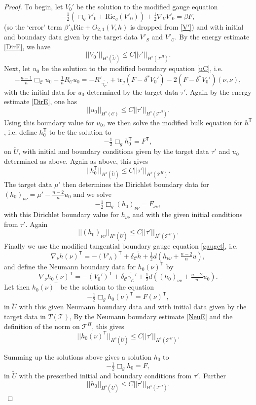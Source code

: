 \documentclass[10pt]{amsart}
\renewcommand{\b}{\beta}
\newcommand{\g}{\gamma}
\renewcommand{\d}{\delta}
\newcommand{\cC}{{\mathcal C}}
\newcommand{\cT}{{\mathcal T}}
\newcommand{\Ric}{\mathrm{Ric}}
\newcommand{\tT}{\mathsf{T}}
\newcommand{\be}{\begin{equation}}
\newcommand{\ee}{\end{equation}}
\newcommand{\tr}{\mathrm{tr}}
\newcommand{\<}{\langle}
\renewcommand{\>}{\rangle}
\newcommand{\w}{\widetilde}
\theoremstyle{plain}
\theoremstyle{remark}
\theoremstyle{definition}
\numberwithin{equation}{section}
\begin{document}
\begin{proof}
  To begin, let $V_0'$ be the solution to the modified gauge equation 
\be \label{modV'}
-\tfrac{1}{2}(\Box_g V'_0+ \Ric_g (V'_0)) + \tfrac{1}{2}\nabla_{V} V'_0 = \b F,
\ee
(so the `error' term $\b'_h \Ric + O_{2,1}(V,h)$ is dropped from \eqref{V'}) and with initial and boundary data given by the target data $V'_S$ and $V'_{\cC}$.  
By the energy estimate \eqref{DirE}, we have 
$$||V_0'||_{H^s(\w U)} \leq C||\tau'||_{H^s(\cT^H)}.$$
 Next, let $u_0$ be the solution to the modified boundary equation \eqref{uC}, i.e. 
\be \label{modu}
-\tfrac{n-1}{n}\Box_\cC u_0-\tfrac{1}{n}R_\cC u_0 = -R'_{\ring{\g_{\cC}'}} + \tr_g(F - \d^*V_0') - 2(F - \d^*V_0')(\nu,\nu),
\ee
with the initial data for $u_0$ determined by the target data $\tau'$. Again by the energy estimate \eqref{DirE}, one has 
$$||u_0||_{H^s(\cC)} \leq C||\tau'||_{H^s(\cT^H)}.$$
Using this boundary value for $u_0$, we then solve the modified bulk equation for $h^{\tT}$, i.e. define $h_0^{\tT}$ to be the solution to 
$$-\tfrac{1}{2}\Box_g h_0^{\tT}   = F^{\tT},$$
on $\w U$, with initial and boundary conditions given by the target data $\tau'$ and $u_0$ determined as above. 
Again as above, this gives  
$$||h_0^{\tT}||_{H^s(\w U)} \leq C||\tau'||_{H^s(\cT^H)}.$$
The target data $\mu'$ then determines the Dirichlet boundary data for $(h_0)_{\nu\nu} = \mu' - \frac{n-2}{n}u_0$ and we solve 
$$-\tfrac{1}{2}\Box_g (h_0)_{\nu \nu}  = F_{\nu \nu},$$
with this Dirichlet boundary value for $h_{\nu \nu}$ and with the given initial conditions from $\tau'$. Again 
$$||(h_0)_{\nu\nu}||_{H^s(\w U)} \leq C||\tau'||_{H^s(\cT^H)}.$$
Finally we use the modified tangential boundary gauge equation \eqref{gauget}, i.e.
\be \label{gauget2}
\nabla_{\nu}h(\nu)^{\tT} = -(V'_h)^{\tT}+ \d_{\cC}\ring{h}+ \tfrac{1}{2}d (h_{\nu \nu} + \tfrac{n-2}{n}u) ,
\ee
and define the Neumann boundary data for $h_0(\nu)^{\tT}$ by 
$$\nabla_{\nu}h_0(\nu)^{\tT} = -(V_0')^{\tT}+ \d_{\cC}\ring{\g_{\cC}'}+ \tfrac{1}{2}d ((h_0)_{\nu \nu} + \tfrac{n-2}{n}u_0).$$
Let then $h_0(\nu)^{\tT}$ be the solution to the equation 
$$-\tfrac{1}{2}\Box_g h_0(\nu)^{\tT}  = F(\nu)^{\tT},$$
in $\w U$ with this given Neumann boundary data and with initial data given by the target data in $T( \cT)$, By the Neumann boundary estimate 
\eqref{NeuE} and the definition of the norm on $\cT^H$, this gives 
$$||h_0(\nu)^{\tT}||_{H^s(\w U)} \leq C||\tau'||_{H^s(\cT^H)}.$$

   Summing up the solutions above gives a solution $h_0$ to 
$$-\tfrac{1}{2}\Box_g h_0 = F,$$
in $\w U$ with the prescribed initial and boundary conditions from $\tau'$. Further  
$$||h_0||_{H^s(\w U)} \leq C||\tau'||_{H^s(\cT^H)}.$$


\end{proof}
\end{document}
